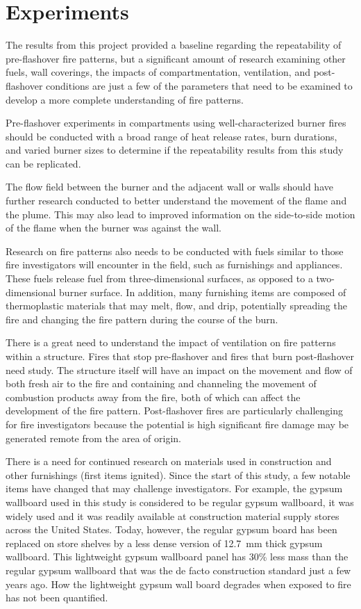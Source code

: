\documentclass[twoside]{uocthesis}
\begin{document}
{\section{Experiments}

The results from this project provided a baseline regarding the repeatability of pre-flashover fire patterns, but a significant amount of research examining other fuels, wall coverings, the impacts of compartmentation, ventilation, and post-flashover conditions are just a few of the parameters that need to be examined to develop a more complete understanding of fire patterns.

Pre-flashover experiments in compartments using well-characterized burner fires should be conducted with a broad range of heat release rates, burn durations, and varied burner sizes to determine if the repeatability results from this study can be replicated. 

The flow field between the burner and the adjacent wall or walls should have further research conducted to better understand the movement of the flame and the plume.  This may also lead to improved information on the side-to-side motion of the flame when the burner was against the wall.  

Research on fire patterns also needs to be conducted with fuels similar to those fire investigators will encounter in the field, such as furnishings and appliances. 
These fuels release fuel from three-dimensional surfaces, as opposed to a two-dimensional burner surface.  In addition, many furnishing items are composed of thermoplastic materials that may melt, flow, and drip, potentially spreading the fire and changing the fire pattern during the course of the burn.

There is a great need to understand the impact of ventilation on fire patterns within a structure.  Fires that stop pre-flashover and fires that burn post-flashover need study.  The structure itself will have an impact on the movement and flow of both fresh air to the fire and containing and channeling the movement of combustion products away from the fire, both of which can affect the development of the fire pattern.  Post-flashover fires are particularly challenging for fire investigators because the potential is high significant fire damage may be generated remote from the area of origin.  

There is a need for continued research on materials used in construction and other furnishings (first items ignited).  Since the start of this study, a few notable items have changed that may challenge investigators.  For example, the gypsum wallboard used in this study is considered to be regular gypsum wallboard, it was widely used and it was readily available at construction material supply stores across the United States.  Today, however, the regular gypsum board has been replaced on store shelves by a less dense version of 12.7~mm thick gypsum wallboard.  This lightweight gypsum wallboard panel has 30\% less mass than the regular gypsum wallboard that was the de facto construction standard just a few years ago.  How the lightweight gypsum wall board degrades when exposed to fire has not been quantified.    

}
\end{document}
